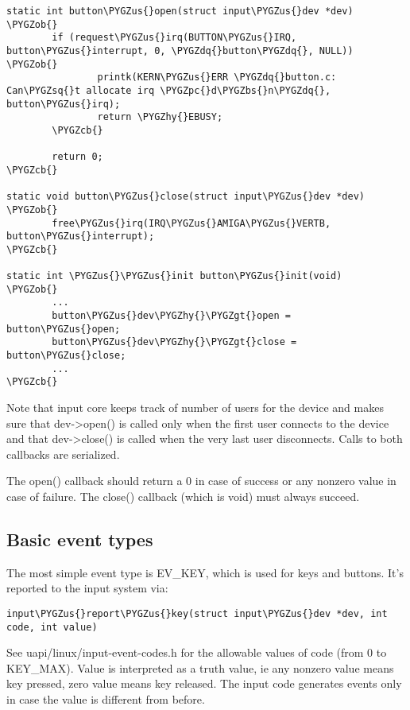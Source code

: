 \documentclass[a4paper,8pt,english]{sphinxmanual}
\def\PYGZbs{\char`\\}
\def\PYGZus{\char`\_}
\def\PYGZob{\char`\{}
\def\PYGZcb{\char`\}}
\def\PYGZgt{\char`\>}
\def\PYGZpc{\char`\%}
\def\PYGZhy{\char`\-}
\def\PYGZsq{\char`\'}
\def\PYGZdq{\char`\"}
\renewcommand\PYGZsq{\textquotesingle}
\begin{document}
\begin{Verbatim}[commandchars=\\\{\}]
static int button\PYGZus{}open(struct input\PYGZus{}dev *dev)
\PYGZob{}
        if (request\PYGZus{}irq(BUTTON\PYGZus{}IRQ, button\PYGZus{}interrupt, 0, \PYGZdq{}button\PYGZdq{}, NULL)) \PYGZob{}
                printk(KERN\PYGZus{}ERR \PYGZdq{}button.c: Can\PYGZsq{}t allocate irq \PYGZpc{}d\PYGZbs{}n\PYGZdq{}, button\PYGZus{}irq);
                return \PYGZhy{}EBUSY;
        \PYGZcb{}

        return 0;
\PYGZcb{}

static void button\PYGZus{}close(struct input\PYGZus{}dev *dev)
\PYGZob{}
        free\PYGZus{}irq(IRQ\PYGZus{}AMIGA\PYGZus{}VERTB, button\PYGZus{}interrupt);
\PYGZcb{}

static int \PYGZus{}\PYGZus{}init button\PYGZus{}init(void)
\PYGZob{}
        ...
        button\PYGZus{}dev\PYGZhy{}\PYGZgt{}open = button\PYGZus{}open;
        button\PYGZus{}dev\PYGZhy{}\PYGZgt{}close = button\PYGZus{}close;
        ...
\PYGZcb{}
\end{Verbatim}

Note that input core keeps track of number of users for the device and
makes sure that dev-\textgreater{}open() is called only when the first user connects
to the device and that dev-\textgreater{}close() is called when the very last user
disconnects. Calls to both callbacks are serialized.

The open() callback should return a 0 in case of success or any nonzero value
in case of failure. The close() callback (which is void) must always succeed.


\subsection{Basic event types}
\label{input/input-programming:basic-event-types}
The most simple event type is EV\_KEY, which is used for keys and buttons.
It's reported to the input system via:

\begin{Verbatim}[commandchars=\\\{\}]
input\PYGZus{}report\PYGZus{}key(struct input\PYGZus{}dev *dev, int code, int value)
\end{Verbatim}

See uapi/linux/input-event-codes.h for the allowable values of code (from 0 to
KEY\_MAX). Value is interpreted as a truth value, ie any nonzero value means key
pressed, zero value means key released. The input code generates events only
in case the value is different from before.
\end{document}
